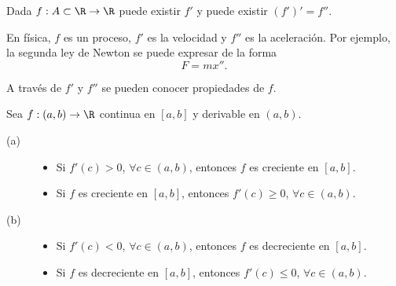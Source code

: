 Dada $\displaystyle f : A \subset \R \to \R $ puede existir $\displaystyle f' $ y puede existir $\displaystyle \left(f'\right)' = f'' $. 
\begin{observation}
\normalfont En física, $\displaystyle f $ es un proceso, $\displaystyle f' $ es la velocidad y $\displaystyle f'' $ es la aceleración. Por ejemplo, la segunda ley de Newton se puede expresar de la forma 
\[ F = m x'' .\]
\end{observation}
A través de $\displaystyle f' $ y $\displaystyle f'' $ se pueden conocer propiedades de $\displaystyle f $. 
\begin{ftheorem}[]
	\normalfont Sea $\displaystyle f : \left(a,b\right) \to \R $ continua en $\displaystyle [a,b] $ y derivable en $\displaystyle \left(a,b\right) $. 
\begin{description}
	\item[(a)] 
		\begin{itemize}
			\item Si $\displaystyle f'\left(c\right) > 0 $, $\displaystyle \forall c \in \left(a,b\right) $, entonces $\displaystyle f $ es creciente en $\displaystyle [a,b] $.
			\item Si $\displaystyle f $ es creciente en $\displaystyle [a,b] $, entonces $\displaystyle f'\left(c\right) \geq 0 $, $\displaystyle \forall c \in \left(a,b\right) $.
		\end{itemize}
		
	\item[(b)] 
		\begin{itemize}
			\item Si $\displaystyle f'\left(c\right) < 0 $, $\displaystyle \forall c \in \left(a,b\right) $, entonces $\displaystyle f $ es decreciente en $\displaystyle [a,b] $.
			\item Si $\displaystyle f $ es decreciente en $\displaystyle [a,b] $, entonces $\displaystyle f'\left(c\right) \leq 0 $, $\displaystyle \forall c \in \left(a,b\right) $.
		\end{itemize}
		
\end{description}
\end{ftheorem}
